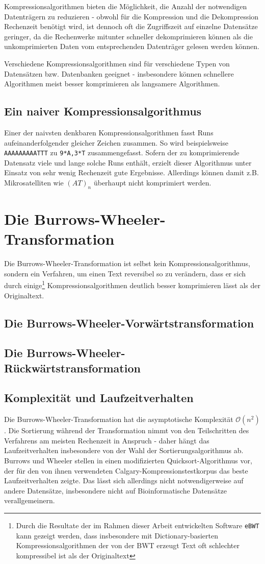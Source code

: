 \documentclass[ngerman,pdftex,paper=A4,DIV=calc,titlepage,12pt]{scrartcl}
\newtheorem[L]{boxedDefinition}{Definition}
\begin{document}
Kompressionsalgorithmen bieten die Möglichkeit, die Anzahl der notwendigen Datenträgern zu reduzieren - obwohl für die Kompression und die Dekompression Rechenzeit benötigt wird, ist dennoch oft die Zugriffszeit auf einzelne Datensätze geringer, da die Rechenwerke mitunter schneller dekomprimieren können als die unkomprimierten Daten vom entsprechenden Datenträger gelesen werden können.

Verschiedene Kompressionsalgorithmen sind für verschiedene Typen von Datensätzen bzw. Datenbanken geeignet - insbesondere können schnellere Algorithmen meist besser komprimieren als langsamere Algorithmen.
\subsection{Ein naiver Kompressionsalgorithmus}
Einer der naivsten denkbaren Kompressionsalgorithmen fasst Runs aufeinanderfolgender gleicher Zeichen zusammen.
So wird beispielsweise \texttt{AAAAAAAAATTT} zu \texttt{9*A,3*T} zusammengefasst. Sofern der zu komprimierende Datensatz viele und lange solche Runs enthält, erzielt dieser Algorithmus unter Einsatz von sehr wenig Rechenzeit gute Ergebnisse. Allerdings können damit z.B. Mikrosatelliten wie $(AT)_n$ überhaupt nicht komprimiert werden.
\section{Die Burrows-Wheeler-Transformation}
Die Burrows-Wheeler-Transformation ist selbst kein Kompressionsalgorithmus, sondern ein Verfahren, um einen Text reversibel so zu verändern, dass er sich durch einige\footnote{Durch die Resultate der im Rahmen dieser Arbeit entwickelten Software \texttt{eBWT} kann gezeigt werden, dass insbesondere mit Dictionary-basierten Kompressionsalgorithmen der von der BWT erzeugt Text oft schlechter kompressibel ist als der Originaltext} Kompressionsalgorithmen deutlich besser komprimieren lässt als der Originaltext.
\subsection{Die Burrows-Wheeler-Vorwärtstransformation}
\subsection{Die Burrows-Wheeler-Rückwärtstransformation}
\subsection{Komplexität und Laufzeitverhalten}
Die Burrows-Wheeler-Transformation hat die asymptotische Komplexität $\mathcal{O}(n^2)$. Die Sortierung während der Transformation nimmt von den Teilschritten des Verfahrens am meisten Rechenzeit in Anspruch - daher hängt das Laufzeitverhalten insbesondere von der Wahl der Sortierungsalgorithmus ab. Burrows und Wheeler stellen in \cite{burrows1994block} einen modifizierten Quicksort-Algorithmus vor, der für den von ihnen verwendeten Calgary-Kompressionstestkorpus das beste Laufzeitverhalten zeigte. Das lässt sich allerdings nicht notwendigerweise auf andere Datensätze, insbesondere nicht auf Bioinformatische Datensätze verallgemeinern.


\renewcommand\refname{Literatur- und Quellenverzeichnis}


\end{document}
